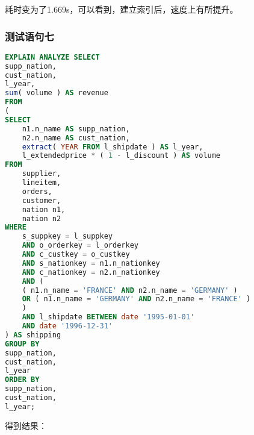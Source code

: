 \documentclass{article}
\begin{document}
耗时变为了1.669s，可以看到，建立索引后，速度上有所提升。

\subsubsection{测试语句七}

\begin{lstlisting}[language=sql]
EXPLAIN ANALYZE SELECT
supp_nation,
cust_nation,
l_year,
sum( volume ) AS revenue 
FROM
(
SELECT
    n1.n_name AS supp_nation,
    n2.n_name AS cust_nation,
    extract( YEAR FROM l_shipdate ) AS l_year,
    l_extendedprice * ( 1 - l_discount ) AS volume 
FROM
    supplier,
    lineitem,
    orders,
    customer,
    nation n1,
    nation n2 
WHERE
    s_suppkey = l_suppkey 
    AND o_orderkey = l_orderkey 
    AND c_custkey = o_custkey 
    AND s_nationkey = n1.n_nationkey 
    AND c_nationkey = n2.n_nationkey 
    AND (
    ( n1.n_name = 'FRANCE' AND n2.n_name = 'GERMANY' ) 
    OR ( n1.n_name = 'GERMANY' AND n2.n_name = 'FRANCE' ) 
    ) 
    AND l_shipdate BETWEEN date '1995-01-01' 
    AND date '1996-12-31' 
) AS shipping 
GROUP BY
supp_nation,
cust_nation,
l_year 
ORDER BY
supp_nation,
cust_nation,
l_year;
\end{lstlisting}

得到结果：
\end{document}
